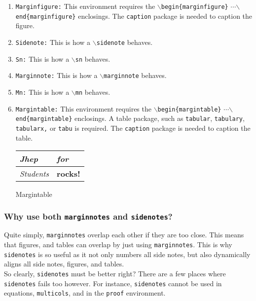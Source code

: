 \documentclass[10pt]{article}
\begin{document}
	\begin{enumerate}
		\item \texttt{Marginfigure:} This environment requires the \texttt{$\backslash$begin\{marginfigure\}} {$\cdots$}\newline\texttt{$\backslash$end\{marginfigure\}} enclosings. The \texttt{caption} package is needed to caption the figure.
		\item \texttt{Sidenote:} This is how a \texttt{$\backslash$sidenote} behaves.
		\item \texttt{Sn:} This is how a \texttt{$\backslash$sn} behaves.
		\item \texttt{Marginnote:} This is how a \texttt{$\backslash$marginnote} behaves.
		\item \texttt{Mn:} This is how a \texttt{$\backslash$mn} behaves.
		\item \texttt{Margintable:} This environment requires the \texttt{$\backslash$begin\{margintable\}} {$\cdots$}\newline\texttt{$\backslash$end\{margintable\}} enclosings. A table package, such as \texttt{tabular}, \texttt{tabulary}, \texttt{tabularx,} or \texttt{tabu} is required. The \texttt{caption} package is needed to caption the table.
		\begin{margintable}
			\begin{tabularx}{\marginparwidth}{|X|X|}
			\hline
			\textit{Jhep} & \textit{for}\\
			\hline
			\textit{Students} & \textbf{rocks!}\\
			\hline
			\end{tabularx}
			\caption{Margintable}
		\end{margintable}
	\end{enumerate}
	\subsubsection{Why use both \texttt{marginnotes} and \texttt{sidenotes}?}
	Quite simply, \texttt{marginnotes} overlap each other if they are too close. This means that figures, and tables can overlap by just using \texttt{marginnotes}. This is why \texttt{sidenotes} is so useful as it not only numbers all side notes, but also dynamically aligns all side notes, figures, and tables.\\


	\noindent So clearly, \texttt{sidenotes} must be better right? There are a few places where \texttt{sidenotes} fails too however. For instance, \texttt{sidenotes} cannot be used in equations, \texttt{multicols}, and in the \texttt{proof} environment.
\end{document}
